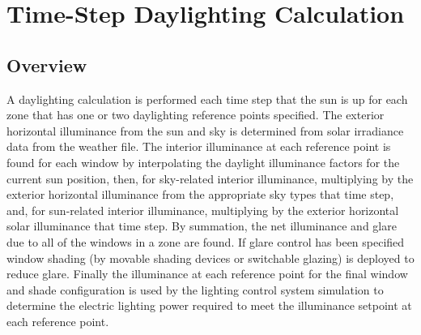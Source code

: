 \section{Time-Step Daylighting Calculation}\label{time-step-daylighting-calculation}

\subsection{Overview}\label{overview-027}

A daylighting calculation is performed each time step that the sun is up for each zone that has one or two daylighting reference points specified. The exterior horizontal illuminance from the sun and sky is determined from solar irradiance data from the weather file. The interior illuminance at each reference point is found for each window by interpolating the daylight illuminance factors for the current sun position, then, for sky-related interior illuminance, multiplying by the exterior horizontal illuminance from the appropriate sky types that time step, and, for sun-related interior illuminance, multiplying by the exterior horizontal solar illuminance that time step. By summation, the net illuminance and glare due to all of the windows in a zone are found. If glare control has been specified window shading (by movable shading devices or switchable glazing) is deployed to reduce glare. Finally the illuminance at each reference point for the final window and shade configuration is used by the lighting control system simulation to determine the electric lighting power required to meet the illuminance setpoint at each reference point.

